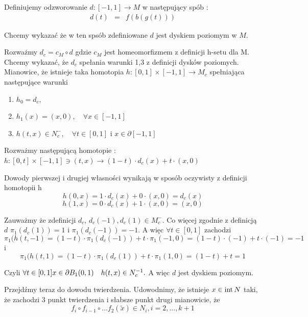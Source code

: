 Definiujemy odzworowanie $d : [-1,1] \to M $ w następujący spób :
	\begin{eqnarray*}
  		d(t) &=& f(b(g(t)))
	\end{eqnarray*}

Chcemy wykazać że w ten spsób zdefiniowane $d$ jest dyskiem poziomym w $M$.

Rozważmy $d_c = c_M \circ d $ gdzie $c_M$ jest homeomorfizmem z definicji h-setu dla M.
Chcemy wykazać, że $d_c$ spełania warunki 1,3 z definicji dysków poziomych.
Mianowice, że istnieje taka homotopia $ h:[0,1]\times [-1,1] \to M_c $ spełniająca następujące warunki
\begin{enumerate}
    \item  $h_0 =d_c, $
    \item  $h_1(x) = (x,0),\quad \forall x \in [-1,1]$
    \item $h(t,x) \in N^-_c,\quad \forall t \in [0,1] \mbox{ i } x \in \partial [-1,1]$
\end{enumerate}

Rozważmy następującą homotopie : 
$h:[0,t]\times [-1,1] \ni (t,x) \to (1-t) \cdot d_c(x) + t\cdot (x,0) $

Dowody pierwszej i drugiej własności wynikają w sposób oczywisty z definicji homotopii h
$$ h(0,x) = 1 \cdot d_c(x) + 0 \cdot (x,0) = d_c(x) $$
$$ h(1,x) = 0 \cdot d_c(x) + 1 \cdot (x,0) = (x,0) $$

Zauważmy że zdefinicji $d_c $, $d_c(-1),d_c(1)\in M^-_c $. Co więcej zgodnie z definicją $ d $ 
$\pi_1(d_c(1)) = 1 $ i $\pi_1(d_c(-1)) = -1 $. A więc $ \forall t \in [0,1] $ zachodzi
$$
 \pi_1( h(t,-1) = (1-t) \cdot \pi_1(d_c(-1)) + t \cdot \pi_1(-1,0) = (1- t) \cdot (-1) + t \cdot (-1) = -1 
$$
i 
$$
  \pi_1( h(t,1) = (1-t) \cdot \pi_1(d_c(1)) + t \cdot \pi_1(1,0) = (1- t) + t = 1
$$

Czyli $ \forall t \in [0,1] x \in \partial B_1(0,1) \quad h(t,x) \in N^{-1}_c.$ 
A więc $ d $ jest dyskiem poziomym.

Przejdźmy teraz do dowodu twierdzenia. 
Udowodnimy, że istnieje $ x \in {\rm int}\, N $ taki, że zachodzi 3 punkt twierdzenia i słabsze punkt 
drugi mianowicie, że 
\begin{equation}
  f_i \circ f_{i-1} \circ \dots f_2(\tilde{x}) \in N_i , i = 2,...,k+1
\end{equation}

